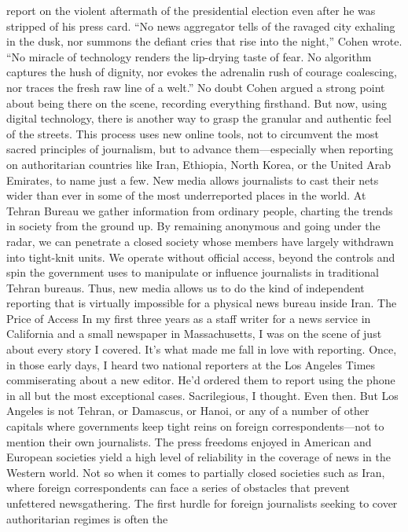 report on the violent aftermath of the presidential election even after he was stripped of
his press card.
``No news aggregator tells of the ravaged city exhaling in the dusk, nor summons the
defiant cries that rise into the night,'' Cohen wrote. ``No miracle of technology renders the
lip-drying taste of fear. No algorithm captures the hush of dignity, nor evokes the
adrenalin rush of courage coalescing, nor traces the fresh raw line of a welt.''
No doubt Cohen argued a strong point about being there on the scene, recording
everything firsthand. But now, using digital technology, there is another way to grasp the
granular and authentic feel of the streets. This process uses new online tools, not to
circumvent the most sacred principles of journalism, but to advance them—especially
when reporting on authoritarian countries like Iran, Ethiopia, North Korea, or the United
Arab Emirates, to name just a few. New media allows journalists to cast their nets wider
than ever in some of the most underreported places in the world.
At Tehran Bureau we gather information from ordinary people, charting the trends in
society from the ground up. By remaining anonymous and going under the radar, we can
penetrate a closed society whose members have largely withdrawn into tight-knit units.
We operate without official access, beyond the controls and spin the government uses to
manipulate or influence journalists in traditional Tehran bureaus. Thus, new media allows
us to do the kind of independent reporting that is virtually impossible for a physical news
bureau inside Iran.
The Price of Access
In my first three years as a staff writer for a news service in California and a small
newspaper in Massachusetts, I was on the scene of just about every story I covered. It’s
what made me fall in love with reporting. Once, in those early days, I heard two national
reporters at the Los Angeles Times commiserating about a new editor. He’d ordered them
to report using the phone in all but the most exceptional cases. Sacrilegious, I thought.
Even then.
But Los Angeles is not Tehran, or Damascus, or Hanoi, or any of a number of other
capitals where governments keep tight reins on foreign correspondents—not to mention
their own journalists. The press freedoms enjoyed in American and European societies
yield a high level of reliability in the coverage of news in the Western world. Not so
when it comes to partially closed societies such as Iran, where foreign correspondents can
face a series of obstacles that prevent unfettered newsgathering.
The first hurdle for foreign journalists seeking to cover authoritarian regimes is often the
